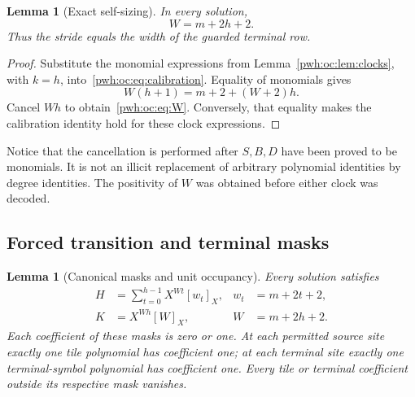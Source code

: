 \documentclass[11pt,letterpaper]{article}
\numberwithin{equation}{section}
\newtheorem{lemma}[theorem]{Lemma}
\theoremstyle{definition}
\newcommand{\rep}[1]{[#1]_X}
\begin{document}
\begin{lemma}[Exact self-sizing]
\label{pwh:oc:lem:calibration}
In every solution,
\begin{equation}
 W=m+2h+2.
 \label{pwh:oc:eq:W}
\end{equation}
Thus the stride equals the width of the guarded terminal row.
\end{lemma}

\begin{proof}
Substitute the monomial expressions from Lemma~\ref{pwh:oc:lem:clocks}, with
$k=h$, into~\eqref{pwh:oc:eq:calibration}. Equality of monomials gives
\[
 W(h+1)=m+2+(W+2)h.
\]
Cancel $Wh$ to obtain~\eqref{pwh:oc:eq:W}. Conversely, that equality makes
the calibration identity hold for these clock expressions.
\end{proof}

Notice that the cancellation is performed after $S,B,D$ have been proved
to be monomials. It is not an illicit replacement of arbitrary polynomial
identities by degree identities. The positivity of $W$ was obtained
before either clock was decoded.

\subsection{Forced transition and terminal masks}

\begin{lemma}[Canonical masks and unit occupancy]
\label{pwh:oc:lem:masks}
Every solution satisfies
\begin{align}
 H&=\sum_{t=0}^{h-1}X^{Wt}\rep{w_t},
       & w_t&=m+2t+2,\label{pwh:oc:eq:Hmask}\\
 K&=X^{Wh}\rep W,
       & W&=m+2h+2.\label{pwh:oc:eq:Kmask}
\end{align}
Each coefficient of these masks is zero or one. At each permitted source
site exactly one tile polynomial has coefficient one; at each terminal
site exactly one terminal-symbol polynomial has coefficient one. Every
tile or terminal coefficient outside its respective mask vanishes.
\end{lemma}
\end{document}
